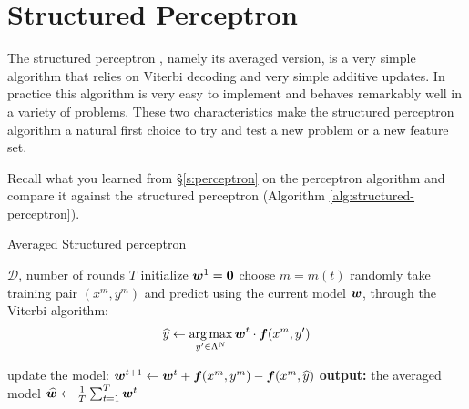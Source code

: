\section{\label{s:spercetron}Structured Perceptron}

The structured perceptron \citep{collins2002discriminative}, namely its averaged version, is a very simple
algorithm that relies on Viterbi decoding and very simple additive
updates. In practice this algorithm is very easy to implement and
behaves remarkably well in a variety of problems. These two
characteristics make the structured perceptron algorithm a natural
first choice to try and test a new problem or a new feature set. 

Recall what you learned from \S\ref{s:perceptron} on the
perceptron algorithm and compare it against the structured perceptron
(Algorithm \ref{alg:structured-perceptron}). 


\begin{algorithm}[t]
   \caption{Averaged Structured perceptron \label{alg:structured-perceptron}}
\begin{algorithmic}[1]
    $\mathcal{D}$, number of rounds $T$
   \STATE initialize $\boldsymbol{w}^1 = \mathbf{0}$
	\STATE choose $m=m(t)$ randomly
	\STATE take training pair $(x^m, y^m)$ and 
predict using the current model $\boldsymbol{w}$, through the Viterbi algorithm: 
	$$\widehat{y}  \leftarrow \operatorname*{arg\,max}_{y' \in \Lambda^N} \boldsymbol{w}^t \cdot \boldsymbol{f}(x^m,y')$$	

	\STATE update the model: 
	$\boldsymbol{w}^{t+1} \leftarrow \boldsymbol{w}^{t} + \boldsymbol{f}(x^m,y^m) - \boldsymbol{f}(x^m,\widehat{y})$
	\ENDFOR
   \STATE \textbf{output:} the averaged model $\widehat{\boldsymbol{w}} \leftarrow \frac{1}{T}\sum_{t=1}^T \boldsymbol{w}^t$
\end{algorithmic}
\end{algorithm}



